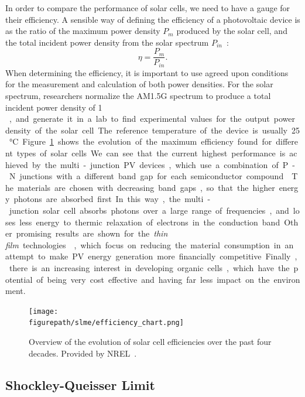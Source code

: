 \begin{refsection}
In order to compare the performance of solar cells, we need to have a gauge 
for their efficiency. A sensible way of defining the efficiency of a 
photovoltaic device is as the ratio of the maximum power density $P_m$ 
produced by the solar cell, and the total incident power density from the 
solar spectrum $P_{in}$~\cite{Fonash2010}: 
\begin{equation} 
\eta = \frac{P_m}{P_{in}}. 
\end{equation} 
When determining the efficiency, it is important to use agreed upon conditions 
for the measurement and calculation of both power densities. For the solar spectrum, 
researchers normalize the AM1.5G spectrum to produce a total incident power 
density of 1 \si{\watt \per \meter\square}, and generate it in a lab to find 
experimental values for the output power density of the solar cell. The 
reference temperature of the device is usually 25 \si{\celsius}. 
Figure~\ref{slme:fig-effchart} shows the evolution of the maximum efficiency 
found for different types of solar cells. We can see that the current highest 
performance is achieved by the multi-junction PV devices, which use a 
combination of P-N junctions with a different band gap for each semiconductor 
compound~\cite{Dimroth2007}. The materials are chosen with decreasing band 
gaps, so that the higher energy photons are absorbed first. In this way, the 
multi-junction solar cell absorbs photons over a large range of frequencies, 
and loses less energy to thermic relaxation of electrons in the conduction 
band. Other promising results are shown for the \textit{thin film} 
technologies~\cite{Shah2004}, which focus on reducing the material consumption 
in an attempt to make PV energy generation more financially competitive. 
Finally, there is an increasing interest in developing organic cells, which 
have the potential of being very cost effective and having far less impact on 
the environment. 
 
\begin{figure}[ht]  
\centering 
\texttt{[image: \\figurepath/slme/efficiency\_chart.png]} 
\caption{\label{slme:fig-effchart} Overview of the evolution of solar cell 
efficiencies over the past four decades. Provided by NREL~\cite{NREL2019}.} 
\end{figure} 
 
\subsection{Shockley-Queisser Limit} \label{slme:sec-SQlimit} 
 

\end{refsection}
